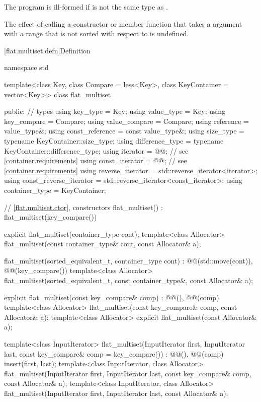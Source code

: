 \pnum
The program is ill-formed if  is not the same type
as .

\pnum
The effect of calling a constructor or member function
that takes a  argument with a range
that is not sorted with respect to  is undefined.

[flat.multiset.defn]{Definition}

\begin{codeblock}
namespace std {
  template<class Key, class Compare = less<Key>, class KeyContainer = vector<Key>>
  class flat_multiset {
  public:
    // types
    using key_type                  = Key;
    using value_type                = Key;
    using key_compare               = Compare;
    using value_compare             = Compare;
    using reference                 = value_type&;
    using const_reference           = const value_type&;
    using size_type                 = typename KeyContainer::size_type;
    using difference_type           = typename KeyContainer::difference_type;
    using iterator                  = @@;  // see \ref{container.requirements}
    using const_iterator            = @@;  // see \ref{container.requirements}
    using reverse_iterator          = std::reverse_iterator<iterator>;
    using const_reverse_iterator    = std::reverse_iterator<const_iterator>;
    using container_type            = KeyContainer;

    // \ref{flat.multiset.ctor}, constructors
    flat_multiset() : flat_multiset(key_compare()) { }

    explicit flat_multiset(container_type cont);
    template<class Allocator>
      flat_multiset(const container_type& cont, const Allocator& a);

    flat_multiset(sorted_equivalent_t, container_type cont)
      : @@(std::move(cont)), @@(key_compare()) { }
    template<class Allocator>
      flat_multiset(sorted_equivalent_t, const container_type&, const Allocator& a);

    explicit flat_multiset(const key_compare& comp)
      : @@(), @@(comp) { }
    template<class Allocator>
      flat_multiset(const key_compare& comp, const Allocator& a);
    template<class Allocator>
      explicit flat_multiset(const Allocator& a);

    template<class InputIterator>
      flat_multiset(InputIterator first, InputIterator last,
                    const key_compare& comp = key_compare())
        : @@(), @@(comp)
        { insert(first, last); }
    template<class InputIterator, class Allocator>
      flat_multiset(InputIterator first, InputIterator last,
                    const key_compare& comp, const Allocator& a);
    template<class InputIterator, class Allocator>
      flat_multiset(InputIterator first, InputIterator last, const Allocator& a);

}}
\end{codeblock}
